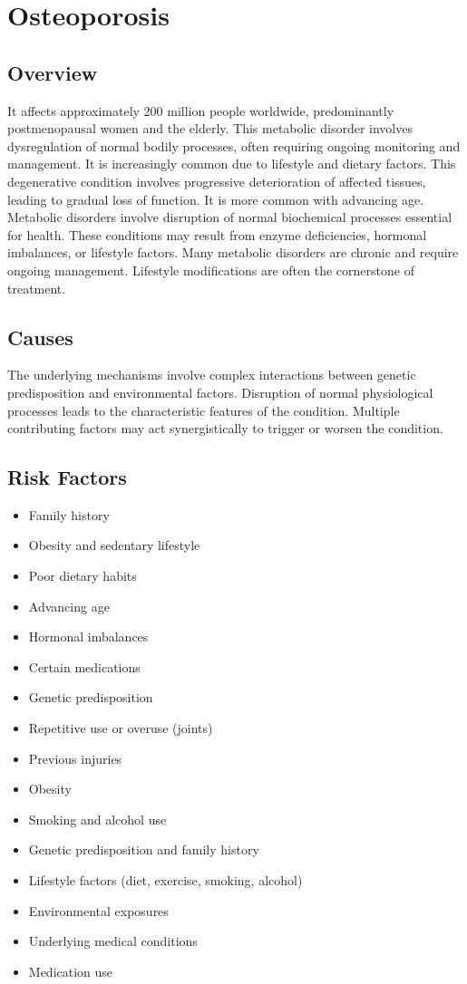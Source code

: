 \chapter{Osteoporosis}
\label{sec:Osteoporosis}

\section{Overview}
It affects approximately 200 million people worldwide, predominantly postmenopausal women and the elderly. This metabolic disorder involves dysregulation of normal bodily processes, often requiring ongoing monitoring and management. It is increasingly common due to lifestyle and dietary factors. This degenerative condition involves progressive deterioration of affected tissues, leading to gradual loss of function. It is more common with advancing age. Metabolic disorders involve disruption of normal biochemical processes essential for health. These conditions may result from enzyme deficiencies, hormonal imbalances, or lifestyle factors. Many metabolic disorders are chronic and require ongoing management. Lifestyle modifications are often the cornerstone of treatment.
\section{Causes}
The underlying mechanisms involve complex interactions between genetic predisposition and environmental factors. Disruption of normal physiological processes leads to the characteristic features of the condition. Multiple contributing factors may act synergistically to trigger or worsen the condition.
\section{Risk Factors}


\begin{itemize}[noitemsep]
  \item Family history
  \item Obesity and sedentary lifestyle
  \item Poor dietary habits
  \item Advancing age
  \item Hormonal imbalances
  \item Certain medications
  \item Genetic predisposition
  \item Repetitive use or overuse (joints)
  \item Previous injuries
  \item Obesity
  \item Smoking and alcohol use
  \item Genetic predisposition and family history
  \item Lifestyle factors (diet, exercise, smoking, alcohol)
  \item Environmental exposures
  \item Underlying medical conditions
  \item Medication use
\end{itemize}
